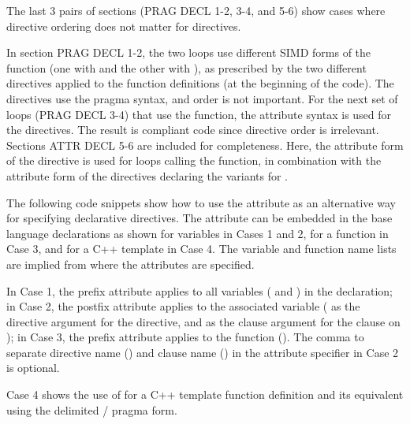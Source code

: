 \begin{ccppspecific}[4ex]
The last 3 pairs of sections (PRAG DECL 1-2, 3-4, and 5-6) show cases where 
directive ordering does not matter for  directives. 

In section PRAG DECL 1-2, the two loops use different SIMD forms of the  function
(one with  and the other with ), 
as prescribed by the two different  directives
applied to the  function definitions (at the beginning of the code). 
The directives use the pragma syntax, and order is not important. 
For the next set of loops 
(PRAG DECL 3-4) that use the  function, the attribute syntax is 
used for the  directives. 
The result is compliant code since directive order is irrelevant.
Sections ATTR DECL 5-6 are included for completeness. Here, the attribute 
form of the  directive is used for loops calling the  function, 
in combination with the attribute form of the  
directives declaring the variants for .

\newpage
{}

The following code snippets show how to use the  attribute
as an alternative way for specifying declarative directives.
The  attribute can be embedded in the base
language declarations as shown for variables in Cases 1 and 2, 
for a function in Case 3, and for a C++ template in Case 4.
The variable and function name lists are implied from where
the attributes are specified.

In Case 1, the prefix attribute applies
to all variables ( and ) in the declaration;
in Case 2, the postfix attribute applies to the associated variable
( as the directive argument for the  directive,
and  as the clause argument for the  clause
on );
in Case 3, the prefix attribute applies to the function ().
The comma to separate directive name () and 
clause name () in
the  attribute specifier in Case 2 is optional.

Case 4 shows the use of  for 
a C++ template function definition
and its equivalent using the delimited
/ pragma form.

\end{ccppspecific}

